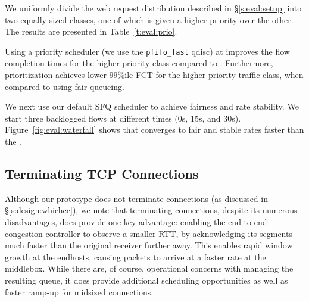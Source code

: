 \label{s:eval:strictprio}
We uniformly divide the web request distribution described in \S\ref{s:eval:setup} into two equally sized classes, one of which is given a higher priority over the other.   The results are presented in Table~\ref{t:eval:prio}.

Using a priority scheduler (we use the \texttt{pfifo\_fast} qdisc) at \inbox improves the flow completion times for the higher-priority class compared to \baseline.
Furthermore, prioritization achieves \strictPrioTailImprovementOverFq lower $99$\%ile FCT for the higher priority traffic class, when compared to using fair queueing.


\label{s:eval:waterfall}
We next use our default SFQ scheduler to achieve fairness and rate stability. We start three backlogged flows at different times (0s, 15s, and 30s). Figure~\ref{fig:eval:waterfall} shows that \name converges to fair and stable rates faster than the \baseline.


\subsection{Terminating TCP Connections}\label{s:eval:proxy}

Although our \name prototype does not terminate connections (as discussed in \S\ref{s:design:whichcc}), we note that terminating connections, despite its numerous disadvantages, does provide one key advantage: enabling the end-to-end congestion controller to observe a smaller RTT, by acknowledging its segments much faster than the original receiver further away. 
This enables rapid window growth at the endhosts, causing packets to arrive at a faster rate at the middlebox.
While there are, of course, operational concerns with managing the resulting queue, it does provide additional scheduling opportunities as well as faster ramp-up for midsized connections.

